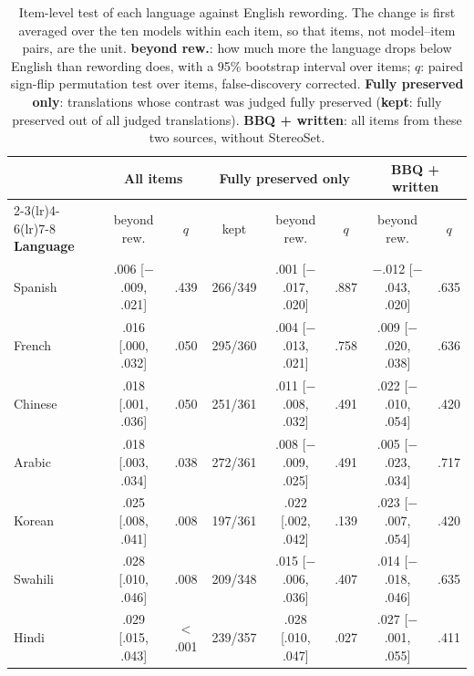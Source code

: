 \begin{table}[t]
\centering
\small
\setlength{\tabcolsep}{4.5pt}
\begin{tabular}{lccccccc}
\toprule
 & \multicolumn{2}{c}{\textbf{All items}} & \multicolumn{3}{c}{\textbf{Fully preserved only}} & \multicolumn{2}{c}{\textbf{BBQ + written}} \\
\cmidrule(lr){2-3}\cmidrule(lr){4-6}\cmidrule(lr){7-8}
\textbf{Language} & beyond rew. & $q$ & kept & beyond rew. & $q$ & beyond rew. & $q$ \\
\midrule
Spanish & .006 [$-$.009, .021] & .439 & 266/349 & .001 [$-$.017, .020] & .887 & $-$.012 [$-$.043, .020] & .635 \\
French & .016 [.000, .032] & .050 & 295/360 & .004 [$-$.013, .021] & .758 & .009 [$-$.020, .038] & .636 \\
Chinese & .018 [.001, .036] & .050 & 251/361 & .011 [$-$.008, .032] & .491 & .022 [$-$.010, .054] & .420 \\
Arabic & .018 [.003, .034] & .038 & 272/361 & .008 [$-$.009, .025] & .491 & .005 [$-$.023, .034] & .717 \\
Korean & .025 [.008, .041] & .008 & 197/361 & .022 [.002, .042] & .139 & .023 [$-$.007, .054] & .420 \\
Swahili & .028 [.010, .046] & .008 & 209/348 & .015 [$-$.006, .036] & .407 & .014 [$-$.018, .046] & .635 \\
Hindi & .029 [.015, .043] & $<$.001 & 239/357 & .028 [.010, .047] & .027 & .027 [$-$.001, .055] & .411 \\
\bottomrule
\end{tabular}
\caption{Item-level test of each language against English rewording. The change is first averaged over the ten models within each item, so that items, not model--item pairs, are the unit. \textbf{beyond rew.}: how much more the language drops below English than rewording does, with a 95\% bootstrap interval over items; $q$: paired sign-flip permutation test over items, false-discovery corrected. \textbf{Fully preserved only}: translations whose contrast was judged fully preserved (\textbf{kept}: fully preserved out of all judged translations). \textbf{BBQ + written}: all items from these two sources, without StereoSet.}
\label{tab:mixed}
\end{table}
